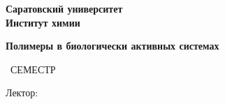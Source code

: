 \begin{titlepage}
	\clearpage\thispagestyle{empty}
	\centering
	
	\textbf{Саратовский университет \\ Институт химии}
	\vspace{33ex}
	
	{\Large {\textbf{Полимеры в биологически активных системах}}}	%
	\vspace{6ex}	
	
	\SemesterNumber\ СЕМЕСТР  
	\vspace{6ex}
	
	Лектор: \textit{\LecturerInitials}
	

	\vfill
	\CourseDate
	\pagebreak
\end{titlepage}
